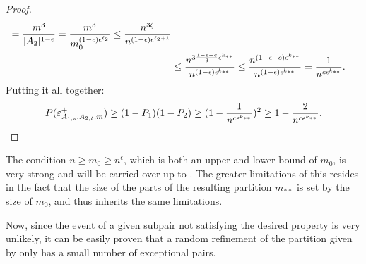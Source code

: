 \begin{lemma}
\begin{proof}
\[\begin{split}
                                = \frac{m^3}{|A_2|^{1-\epsilon}}
                                = \frac{m^3}{m_0^{\parround{1-\epsilon} \epsilon^{\ell_2}}} %
                                \leq \frac{n^{3 \zeta}}{n^{(1-\epsilon)\epsilon^{\ell_2 + 1}}} \\
                            & \leq \frac{n^{3\frac{1-\epsilon-c}{3} \epsilon^{k_{**}}}}{n^{(1-\epsilon)\epsilon^{k_{**}}}}
                                \leq \frac{n^{(1-\epsilon-c) \epsilon^{k_{**}}}}{n^{(1-\epsilon)\epsilon^{k_{**}}}}
                                = \frac{1}{n^{c \epsilon^{k_{**}}}}.
                    \end{split}
                \]
                Putting it all together:
                \[
                    P(\varepsilon^+_{A_{1,s},A_{2,t},m})
                        \geq (1 - P_1) (1 - P_2)
                        \geq ( 1 - \frac{1}{n^{c \epsilon^{k_{**}}}} )^2
                        \geq 1 - \frac{2}{n^{c\epsilon^{k_{**}}}}.
                \]
            \end{proof}
        \end{lemma}

        \begin{remark}
            The condition $n \geq m_0 \geq n^\epsilon$, which is both an upper and lower bound of $m_0$, is very strong and will be carried over
            up to .
            The greater limitations of this resides in the fact that the size of the parts of the resulting partition $m_{**}$
            is set by the size of $m_0$, and thus inherits the same limitations.
        \end{remark}

        Now, since the event of a given subpair not satisfying the desired property is very unlikely, it can be easily proven
        that a random refinement of the partition given by  only has
        a small number of exceptional pairs.

